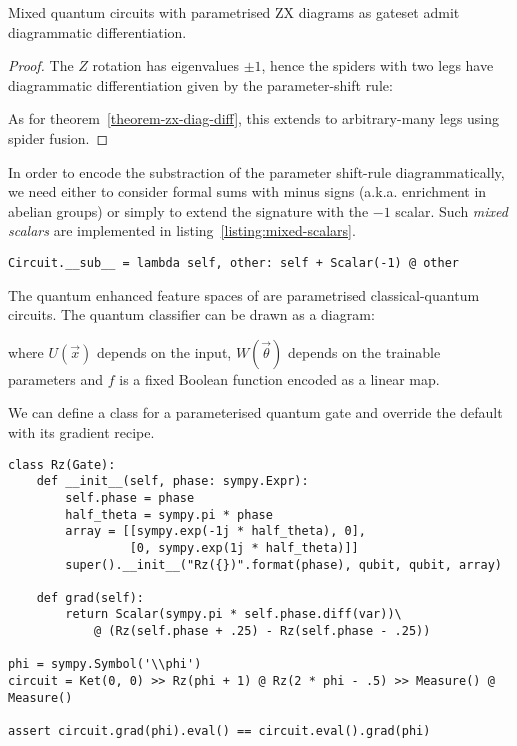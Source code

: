 \begin{corollary}
Mixed quantum circuits with parametrised ZX diagrams as gateset admit diagrammatic differentiation.
\end{corollary}

\begin{proof}
The $Z$ rotation has eigenvalues $\pm 1$, hence the spiders with two legs have
diagrammatic differentiation given by the parameter-shift rule:


As for theorem~\ref{theorem-zx-diag-diff}, this extends to
arbitrary-many legs using spider fusion.
\end{proof}

\begin{remark}
In order to encode the substraction of the parameter shift-rule diagrammatically, we
need either to consider formal sums with minus signs (a.k.a. enrichment in
abelian groups) or simply to extend the signature with the $-1$ scalar.
Such \emph{mixed scalars} are implemented in listing~\ref{listing:mixed-scalars}.

\begin{verbatim}
Circuit.__sub__ = lambda self, other: self + Scalar(-1) @ other
\end{verbatim}
\end{remark}

\begin{example}
The quantum enhanced feature spaces of \cite{HavlicekEtAl19} are parametrised
classical-quantum circuits.
The quantum classifier can be drawn as a diagram:


where $U(\vec{x})$ depends on the input, $W(\vec{\theta})$ depends on the
trainable parameters and $f$ is a fixed Boolean function encoded as a linear map.
\end{example}

\begin{example}
We can define a class for a parameterised quantum gate and override the default  with its gradient recipe.

\begin{verbatim}
class Rz(Gate):
    def __init__(self, phase: sympy.Expr):
        self.phase = phase
        half_theta = sympy.pi * phase
        array = [[sympy.exp(-1j * half_theta), 0],
                 [0, sympy.exp(1j * half_theta)]]
        super().__init__("Rz({})".format(phase), qubit, qubit, array)

    def grad(self):
        return Scalar(sympy.pi * self.phase.diff(var))\
            @ (Rz(self.phase + .25) - Rz(self.phase - .25))

phi = sympy.Symbol('\\phi')
circuit = Ket(0, 0) >> Rz(phi + 1) @ Rz(2 * phi - .5) >> Measure() @ Measure()

assert circuit.grad(phi).eval() == circuit.eval().grad(phi)
\end{verbatim}
\end{example}
